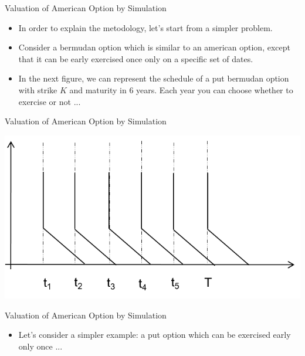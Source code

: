 \documentclass[11pt]{beamer}
\begin{document}
\begin{frame}{Valuation of American Option by Simulation}
\begin{itemize}
\item In order to explain the metodology, let's start from a simpler problem. 
\item Consider a bermudan option which is similar to an american option, except that it can be early exercised once only on a specific set of dates. 
\item In the next figure, we can represent the schedule of a put bermudan option with strike $K$ and maturity in $6$ years. Each year you can choose whether to exercise or not ...
\end{itemize}
\end{frame}
\begin{frame}{Valuation of American Option by Simulation}
\begin{center}
\includegraphics[scale=1]{img/bermudan_exercise_1.png} 
\end{center}
\end{frame}
\begin{frame}{Valuation of American Option by Simulation}
\begin{itemize}
\item Let's consider a simpler example: a put option which can be exercised early only once ... 
\end{itemize}
\end{frame}
\end{document}
